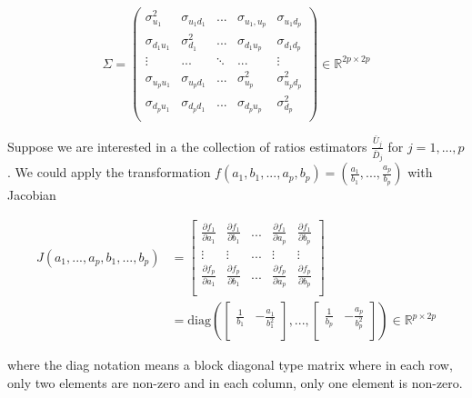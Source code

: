 \documentclass{article}
\begin{document}
\begin{equation*}
    \Sigma = \left(\begin{array}{ccccc}
        \sigma_{u_1}^2  & \sigma_{u_1d_1}  & ... & \sigma_{u_1,u_p} & \sigma_{u_1d_p} \\
        \sigma_{d_1u_1} & \sigma_{d_1}^2   &... & \sigma_{d_1u_p} &\sigma_{d_1d_p} \\
        \vdots   & ... & \ddots  & ... & \vdots  \\
        \sigma_{u_pu_1} & \sigma_{u_pd_1} & ... & \sigma_{u_p}^2  & \sigma_{u_pd_p}^2 \\
        \sigma_{d_pu_1} & \sigma_{d_pd_1} & ... & \sigma_{d_pu_p} & \sigma_{d_p}^2 \\
    \end{array}\right) \in \mathbb{R}^{2p\times 2p}
\end{equation*}

Suppose we are interested in a the collection of ratios estimators $\frac{\bar{U}_j}{\bar{D}_j}$ for $j=1,...,p$. We could apply the transformation $f(a_1,b_1,...,a_p,b_p) = \left(\frac{a_1}{b_1},...,\frac{a_p}{b_p}\right)$ with Jacobian

\begin{align*} 
J(a_1,...,a_p,b_1,...,b_p) &= \begin{bmatrix}
\frac{\partial f_1 }{\partial a_1} & \frac{\partial f_1 }{\partial b_1} & ... &  \frac{\partial f_1 }{\partial a_p}&  \frac{\partial f_1 }{\partial b_p}\\
\vdots  & \vdots &  ... & \vdots & \vdots  \\
\frac{\partial f_p }{\partial a_1} & \frac{\partial f_p }{\partial b_1} & ... &  \frac{\partial f_p }{\partial a_p}   & \frac{\partial f_p }{\partial b_p}\\
\end{bmatrix} \\ 
&= \text{diag}\left(\begin{bmatrix}
\frac{1}{b_1} & -\frac{a_1}{b_1^2} \\ 
\end{bmatrix},...,\begin{bmatrix}
\frac{1}{b_p} & -\frac{a_p}{b_p^2} \\ 
\end{bmatrix} \right) \in \mathbb{R}^{p\times 2p}
\end{align*}  

where the diag notation means a block diagonal type matrix where in each row, only two elements are non-zero and in each column, only one element is non-zero. 
\end{document}
